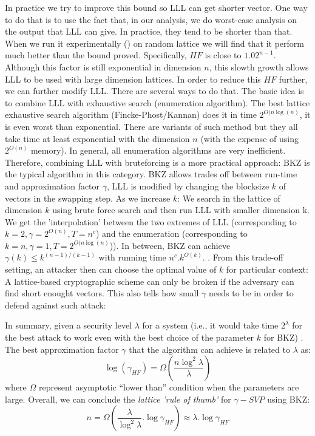 In practice we try to improve this bound so LLL can get shorter vector. One way
to do that is to use the fact that, in our analysis, we do worst-case analysis
on the output that LLL can give. In practice, they tend to be shorter than
that. When we run it experimentally (\cite{nguyen2006lll}) on random lattice we
will find that it perform much better than the bound proved. Specifically, $HF$
is close to $1.02^{n-1}$. Although this factor is still exponential in dimension
$n$, this slowth growth allows LLL to be used with large dimension lattices.  In
order to reduce this $HF$ further, we can further modify LLL.  There are several
ways to do that. The basic idea is to combine LLL with exhaustive search
(enumeration algorithm). The best lattice exhaustive search algorithm
(Fincke-Phost/Kannan) does it in time $2^{O(n\log(n)}$, it is even worst than
exponential. There are variants of such method but they all take time at least
exponential with the dimension $n$ (with the expense of using $2^{O(n)}$
memory). In general, all enumeration algorithms are very inefficient. Therefore,
combining LLL with bruteforcing is a more practical approach: BKZ is the typical
algorithm in this category.  BKZ allows trades off between run-time and
approximation factor $\gamma$, LLL is modified by changing the blocksize $k$ of
vectors in the swapping step. As we increase $k$: We search in the lattice of
dimension $k$ using brute force search and then run LLL with smaller dimension
k. We get the 'interpolation' between the two extremes of LLL (corresponding to
$k = 2, \gamma = 2^{O(n)}, T = n^c$) and the enumeration (corresponding to
$k = n, \gamma=1, T = 2^{O(n\log(n)}$)). In between, BKZ can achieve
$\gamma(k) \leq k^{(n-1)/(k-1)}$ with running time
$n^c.k^{O(k)}$. \cite{hanrot2011terminating}. From this trade-off setting, an
attacker then can choose the optimal value of $k$ for particular context: A
lattice-based cryptographic scheme can only be broken if the adversary can find
short enought vectors. This also tells how small $\gamma$ needs to be in order
to defend against such attack:

In summary, given a security level $\lambda$ for a system (i.e., it would take
time $2^\lambda$ for the best attack to work even with the best choice of the
parameter $k$ for BKZ) .  The best approximation factor $\gamma$ that the
algorithm can achieve is related to $\lambda$ as:
\[
  \log(\gamma_{HF}) = \Omega(\frac{n\log^2\lambda}{\lambda})
\]
where $\Omega$ represent asymptotic ``lower than'' condition when the parameters
are large. Overall, we can conclude the \emph{lattice 'rule of thumb'} for
$\gamma-SVP$ using BKZ:
\[
  n = \Omega(\frac{\lambda}{\log^2\lambda}.\log\gamma_{HF}) \approx \lambda
  . \log\gamma_{HF}
\]

